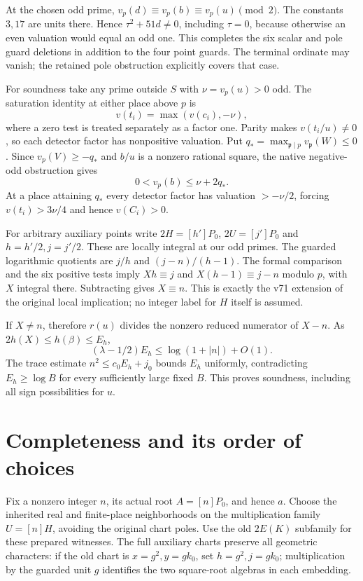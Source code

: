 \documentclass[11pt,a4paper]{article}
\begin{document}
At the chosen odd prime, $v_p(d)\equiv v_p(b)\equiv v_p(u)\pmod2$.
The constants $3,17$ are units there. Hence $\tau^2+51d\ne0$, including
$\tau=0$, because otherwise an even valuation would equal an odd one.
This completes the six scalar and pole guard deletions in addition to
the four point guards. The terminal ordinate may
vanish; the retained pole obstruction explicitly covers that case.

For soundness take any prime outside $S$ with $\nu=v_p(u)>0$ odd.
The saturation identity at either place above $p$ is
\[
 v(t_i)=\max(v(c_i),-\nu),
\]
where a zero test is treated separately as a factor one. Parity makes
$v(t_i/u)\ne0$, so each detector factor has nonpositive valuation.
Put $q_*=\max_{\mathfrak p\mid p}v_{\mathfrak p}(W)\le0$.
Since $v_p(V)\ge-q_*$ and $b/u$ is a nonzero rational square, the native
negative-odd obstruction gives
\[
 0<v_p(b)\le\nu+2q_*.
\]
At a place attaining $q_*$ every detector factor has valuation
$> -\nu/2$, forcing $v(t_i)>3\nu/4$ and hence $v(C_i)>0$.

For arbitrary auxiliary points write $2H=[h']P_0$, $2U=[j']P_0$ and
$h=h'/2,j=j'/2$. These are locally integral at our odd primes.
The guarded logarithmic quotients are $j/h$ and $(j-n)/(h-1)$.
The formal comparison and the six positive tests imply
$Xh\equiv j$ and $X(h-1)\equiv j-n$ modulo $p$, with $X$ integral there.
Subtracting gives $X\equiv n$. This is exactly the v71 extension of the
original local implication; no integer label for $H$ itself is assumed.

If $X\ne n$, therefore $r(u)$ divides the nonzero reduced numerator of
$X-n$. As $2h(X)\le h(\beta)\le E_h$,
\[
 (\lambda-1/2)E_h\le\log(1+|n|)+O(1).
\]
The trace estimate $n^2\le c_0E_h+j_0$ bounds $E_h$ uniformly, contradicting
$E_h\ge\log B$ for every sufficiently large fixed $B$. This proves
soundness, including all sign possibilities for $u$.

\section{Completeness and its order of choices}
Fix a nonzero integer $n$, its actual root $A=[n]P_0$, and hence $a$.
Choose the inherited real and finite-place neighborhoods on the
multiplication family $U=[n]H$, avoiding the original chart poles.
Use the old $2E(K)$ subfamily for these prepared witnesses. The full
auxiliary charts preserve all geometric characters: if the old chart is
$x=g^2,y=gk_0$, set $h=g^2,j=gk_0$; multiplication by the guarded unit $g$
identifies the two square-root algebras in each embedding.
\end{document}
